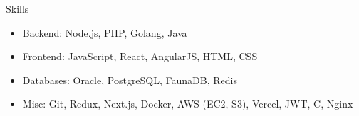 \documentclass[calibri]{mcdowellcv}
\begin{document}
	\begin{cvsection}{Skills}
		\begin{cvsubsection}{}{}{}	
			\begin{itemize}
				\item Backend: Node.js, PHP, Golang, Java
				\item Frontend: JavaScript, React, AngularJS, HTML, CSS
				\item Databases: Oracle, PostgreSQL, FaunaDB, Redis
				\item Misc: Git, Redux, Next.js, Docker, AWS (EC2, S3), Vercel, JWT, C, Nginx
			\end{itemize}
		\end{cvsubsection}
	\end{cvsection}
	
\end{document}
